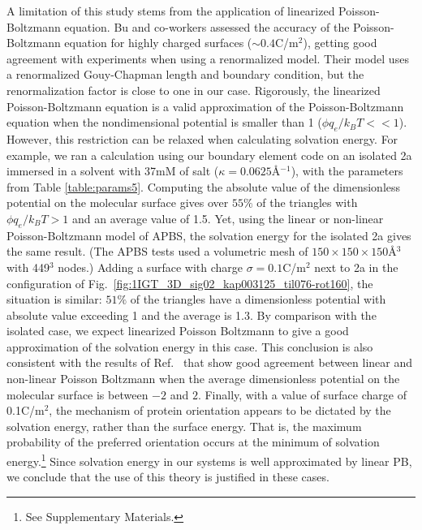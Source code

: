  \medskip
A limitation of this study stems from the application of linearized Poisson-Boltzmann equation.
Bu and co-workers\cite{BuVakninTravesset2006} assessed the accuracy of the Poisson-Boltzmann equation for highly charged surfaces ($\sim 0.4$C/m$^2$), getting good agreement with experiments when using a renormalized model. 
Their model uses a renormalized Gouy-Chapman length and boundary condition, but the renormalization factor is close to one in our case. 
Rigorously, the linearized Poisson-Boltzmann equation is a valid approximation of the Poisson-Boltzmann equation when the nondimensional potential is smaller than 1 ($\phi q_e/k_BT<<1$).
However, this restriction can be relaxed when calculating solvation energy. 
For example, we ran a calculation using our boundary element code on an isolated \ig 2a immersed in a solvent with 37mM of salt ($\kappa = 0.0625$\AA$^{-1}$), with the parameters from Table \ref{table:params5}. 
Computing the absolute value of the dimensionless potential on the molecular surface gives over $55\%$ of the triangles with $\phi q_e/k_BT>1$ and an average value of 1.5.
Yet, using the linear or non-linear Poisson-Boltzmann model of APBS,\cite{BakerETal2001} the solvation energy for the isolated \ig 2a gives the same result.
(The APBS tests used a volumetric mesh of $150\times 150\times 150$\AA$^3$ with 449$^3$ nodes.)
Adding a surface with charge $\sigma=0.1$C/m$^2$ next to \ig 2a in the configuration of Fig.~\ref{fig:1IGT_3D_sig02_kap003125_til076-rot160}, the situation is similar: $51\%$ of the triangles have a dimensionless potential with absolute value exceeding 1 and the average is 1.3. By comparison with the isolated  case, we expect linearized Poisson Boltzmann to give a good approximation of the solvation energy in this case.
This conclusion is also consistent with the results of Ref.~ that show good agreement between linear and non-linear Poisson Boltzmann when the average dimensionless potential on the molecular surface is between $-2$ and $2$. 
Finally, with a value of surface charge of 0.1C/m$^2$, the mechanism of protein orientation appears to be dictated by the solvation energy, rather than the surface energy. That is, the maximum probability of the preferred orientation occurs at the minimum of solvation energy.\footnote{See Supplementary Materials.} Since solvation energy in our systems is well approximated by linear PB, we conclude that the use of this theory is justified in these cases.


